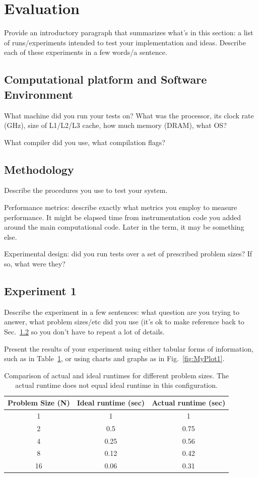 \section{Evaluation}

Provide an introductory paragraph that summarizes what's in this section: a list of runs/experiments intended to test your implementation and ideas. Describe each of these experiments in a few words/a sentence.

\subsection{Computational platform and Software Environment}

What machine did you run your tests on? What was the processor, its clock rate (GHz), size of L1/L2/L3 cache, how much memory (DRAM), what OS?

What compiler did you use, what compilation flags?

\subsection{Methodology}
\label{sec:methodology}

Describe the procedures you use to test your system.

Performance metrics: describe exactly what metrics you employ to measure performance. It might be elapsed time from instrumentation code you added around the main computational code. Later in the term, it may be something else.

Experimental design: did you run tests over a set of prescribed problem sizes? If so, what were they?

\subsection{Experiment 1}

Describe the experiment in a few sentences: what question are you trying to answer, what problem sizes/etc did you use (it's ok to make reference back to Sec.~\ref{sec:methodology} so you don't have to repeat a lot of details. 

Present the results of your experiment using either tabular forms of information, such as in Table~\ref{tab:MyTable1}, or using charts and graphs as in Fig.~\ref{fig:MyPlot1}.

\begin{table}[t!]
    \centering
    \begin{tabular}{c c c}
        Problem Size (N) & Ideal runtime (sec) & Actual runtime (sec) \\
        \hline 
        1 & 1 & 1 \\
        2 & 0.5 & 0.75 \\
        4 & 0.25 & 0.56 \\
        8 & 0.12 & 0.42 \\
        16 & 0.06 & 0.31 
    \end{tabular}
    \caption{Comparison of actual and ideal runtimes for different problem sizes. The actual runtime does not equal ideal runtime in this configuration.}
    \label{tab:MyTable1}
\end{table}

